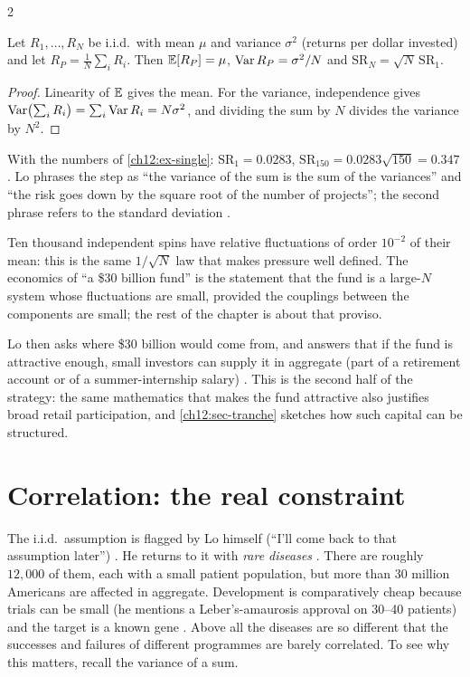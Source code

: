 \begin{paracol}{2}
\begin{proposition}\label{ch12:prop-iid}
Let $R_1,\dots,R_N$ be i.i.d.\ with mean $\mu$ and variance $\sigma^2$ (returns per dollar invested) and let
$R_P=\frac1N\sum_i R_i$. Then $\mathbb{E}[R_P]=\mu$, $\operatorname{Var} R_P=\sigma^2/N$ and $\mathrm{SR}_N=\sqrt N\,\mathrm{SR}_1$.
\end{proposition}
\begin{proof}
Linearity of $\mathbb{E}$ gives the mean. For the variance, independence gives
$\operatorname{Var}\bigl(\sum_iR_i\bigr)=\sum_i\operatorname{Var} R_i=N\sigma^2$, and dividing the sum by $N$ divides the variance by $N^2$.
\end{proof}
With the numbers of \cref{ch12:ex-single}: $\mathrm{SR}_1=0.0283$, $\mathrm{SR}_{150}=0.0283\sqrt{150}=0.347$.
Lo phrases the step as ``the variance of the sum is the sum of the variances'' and ``the risk goes down by the square
root of the number of projects''; the second phrase refers to the standard deviation .

\begin{intuition}
Ten thousand independent spins have relative fluctuations of order $10^{-2}$ of their mean: this is the same
$1/\sqrt N$ law that makes pressure well defined. The economics of ``a \$30 billion fund'' is the statement that
the fund is a large-$N$ system whose fluctuations are small, provided the couplings between the components are
small; the rest of the chapter is about that proviso.
\end{intuition}

Lo then asks where \$30 billion would come from, and answers that if the fund is attractive enough, small
investors can supply it in aggregate (part of a retirement account or of a summer-internship salary)
. This is the second half of the strategy: the same mathematics that makes the fund attractive
also justifies broad retail participation, and \cref{ch12:sec-tranche} sketches how such capital can be
structured.

\section{Correlation: the real constraint}\label{ch12:sec-corr}

The i.i.d.\ assumption is flagged by Lo himself (``I'll come back to that assumption later'')
. He returns to it with \emph{rare diseases} . There are roughly $12{,}000$
of them, each with a small patient population, but more than 30 million Americans are affected in
aggregate. Development is comparatively cheap because trials can be small (he mentions a
Leber's-amaurosis approval on 30--40 patients) and the target is a known gene . Above all
the diseases are so different that the successes and failures of different programmes are barely
correlated. To see why this matters, recall the variance of a sum.


\end{paracol}
